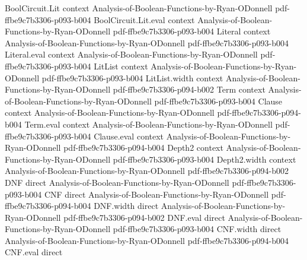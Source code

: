 \begin{theorem}
\leanok
{}
\proofstep
  {BoolCircuit.Lit}
  {context}
  {Analysis-of-Boolean-Functions-by-Ryan-ODonnell}
  {pdf-ffbe9c7b3306-p093-b004}
\proofstep
  {BoolCircuit.Lit.eval}
  {context}
  {Analysis-of-Boolean-Functions-by-Ryan-ODonnell}
  {pdf-ffbe9c7b3306-p093-b004}
\proofstep
  {Literal}
  {context}
  {Analysis-of-Boolean-Functions-by-Ryan-ODonnell}
  {pdf-ffbe9c7b3306-p093-b004}
\proofstep
  {Literal.eval}
  {context}
  {Analysis-of-Boolean-Functions-by-Ryan-ODonnell}
  {pdf-ffbe9c7b3306-p093-b004}
\proofstep
  {LitList}
  {context}
  {Analysis-of-Boolean-Functions-by-Ryan-ODonnell}
  {pdf-ffbe9c7b3306-p093-b004}
\proofstep
  {LitList.width}
  {context}
  {Analysis-of-Boolean-Functions-by-Ryan-ODonnell}
  {pdf-ffbe9c7b3306-p094-b002}
\proofstep
  {Term}
  {context}
  {Analysis-of-Boolean-Functions-by-Ryan-ODonnell}
  {pdf-ffbe9c7b3306-p093-b004}
\proofstep
  {Clause}
  {context}
  {Analysis-of-Boolean-Functions-by-Ryan-ODonnell}
  {pdf-ffbe9c7b3306-p094-b004}
\proofstep
  {Term.eval}
  {context}
  {Analysis-of-Boolean-Functions-by-Ryan-ODonnell}
  {pdf-ffbe9c7b3306-p093-b004}
\proofstep
  {Clause.eval}
  {context}
  {Analysis-of-Boolean-Functions-by-Ryan-ODonnell}
  {pdf-ffbe9c7b3306-p094-b004}
\proofstep
  {Depth2}
  {context}
  {Analysis-of-Boolean-Functions-by-Ryan-ODonnell}
  {pdf-ffbe9c7b3306-p093-b004}
\proofstep
  {Depth2.width}
  {context}
  {Analysis-of-Boolean-Functions-by-Ryan-ODonnell}
  {pdf-ffbe9c7b3306-p094-b002}
\proofstep
  {DNF}
  {direct}
  {Analysis-of-Boolean-Functions-by-Ryan-ODonnell}
  {pdf-ffbe9c7b3306-p093-b004}
\proofstep
  {CNF}
  {direct}
  {Analysis-of-Boolean-Functions-by-Ryan-ODonnell}
  {pdf-ffbe9c7b3306-p094-b004}
\proofstep
  {DNF.width}
  {direct}
  {Analysis-of-Boolean-Functions-by-Ryan-ODonnell}
  {pdf-ffbe9c7b3306-p094-b002}
\proofstep
  {DNF.eval}
  {direct}
  {Analysis-of-Boolean-Functions-by-Ryan-ODonnell}
  {pdf-ffbe9c7b3306-p093-b004}
\proofstep
  {CNF.width}
  {direct}
  {Analysis-of-Boolean-Functions-by-Ryan-ODonnell}
  {pdf-ffbe9c7b3306-p094-b004}
\proofstep
  {CNF.eval}
  {direct}

\end{theorem}
